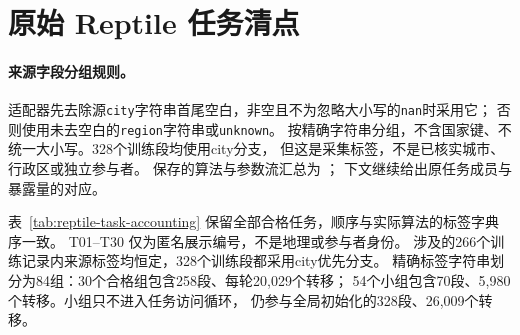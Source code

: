 \section{原始 Reptile 任务清点}
\label{sec:reptile-task-accounting}\hypertarget{sec:reptile-task-accounting}{}
\paragraph{来源字段分组规则。}
适配器先去除源\texttt{city}字符串首尾空白，非空且不为忽略大小写的\texttt{nan}时采用它；
否则使用未去空白的\texttt{region}字符串或\texttt{unknown}。
按精确字符串分组，不含国家键、不统一大小写。328个训练段均使用city分支，
但这是采集标签，不是已核实城市、行政区或独立参与者。
保存的算法与参数流汇总为
；
下文继续给出原任务成员与暴露量的对应。

表~\ref{tab:reptile-task-accounting} 保留全部合格任务，顺序与实际算法的标签字典序一致。
T01--T30 仅为匿名展示编号，不是地理或参与者身份。
涉及的266个训练记录内来源标签均恒定，328个训练段都采用city优先分支。
精确标签字符串划分为84组：30个合格组包含258段、每轮20,029个转移；
54个小组包含70段、5,980个转移。小组只不进入任务访问循环，
仍参与全局初始化的328段、26,009个转移。

